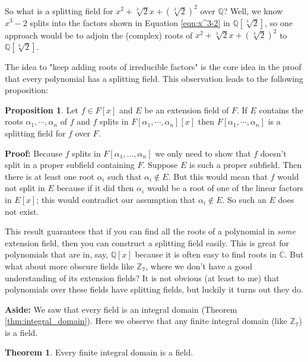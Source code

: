 \documentclass[11pt, oneside]{article}   	%
\theoremstyle{definition}
\newtheorem{thm}{Theorem}[section]
\newtheorem{proposition}{Proposition}[section]
\begin{document}
\bigskip
\noindent
So what is a splitting field for $x^2 + \sqrt[3]{2} x + (\sqrt[3]{2})^2$ over $\mathbb{Q}$? Well, we know $x^3-2$ splits into the factors
shown in Equation \ref{eqn:x^3-2} in $\mathbb{Q}[\sqrt[3]{2}]$, so one approach would be to adjoin the (complex) roots of $x^2 + \sqrt[3]{2} x + (\sqrt[3]{2})^2$
to $\mathbb{Q}[\sqrt[3]{2}]$. 

\bigskip
\noindent
The idea to "keep adding roots of irreducible factors" is the core idea in the proof that every polynomial has a splitting field. This 
observation leads to the following proposition:

\bigskip
\begin{proposition}
Let $f \in F[x]$ and $E$ be an extension field of $F$. If $E$ contains the roots $\alpha_1, \cdots, \alpha_n$ of $f$ and $f$ splits 
in $F[\alpha_1, \cdots, \alpha_n][x]$ then $F[\alpha_1, \cdots, \alpha_n]$ is a splitting field for $f$ over $F$. 
\end{proposition}

\noindent
\textbf{Proof: } Because $f$ splits in $F[\alpha_1, \hdots, \alpha_n]$  we only need to show that $f$ doesn't split
in a proper subfield containing $F$. Suppose $E$ is such a proper subfield.  Then there is at least one root 
$\alpha_i$ such that $\alpha_i \notin E$. But this would mean that $f$ would not split in $E$ because
if it did then $\alpha_i$  would be a root of one of the linear factors in $E[x]$; this would contradict our assumption 
that $\alpha_i \notin E$. So such an $E$ does not exist.

\bigskip
\noindent
This result guarantees that if you can find all the roots of a polynomial in \emph{some} extension field, then you can construct a splitting field easily. 
This is great for polynomials that are in, say,  $\mathbb{Q}[x]$  because it is often easy to find roots in $\mathbb{C}$. But what about more obscure fields like 
$\mathbb{Z}_7$, where we don't have a good understanding of its extension fields? It is not obvious (at least to me) that polynomials 
over these fields have splitting fields, but luckily it turns out they do.

\bigskip
\noindent
\textbf{Aside: } We saw that every field is an integral domain (Theorem \ref{thm:integral_domain}). Here we 
observe that any finite integral domain (like $\mathbb{Z}_7$) is a field.

\bigskip
\begin{thm}
Every finite integral domain is a field.
\label{thm:finite_id_is_a_field}
\end{thm}
\end{document}
